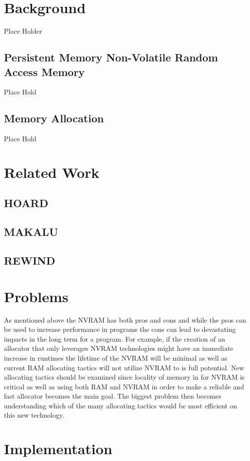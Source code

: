 \documentclass[conference]{IEEEtran}
\begin{document}
\section{Background}
Place Holder
\subsection{Persistent Memory Non-Volatile Random Access Memory}
Place Hold

\subsection{Memory Allocation}
Place Hold


\section{Related Work}
\subsection{HOARD}
\subsection{MAKALU}
\subsection {REWIND} 

\section{Problems}
As mentioned above the NVRAM has both pros and cons and while the pros can be used to increase performance in programs the cons can lead to devastating impacts in the long term for a program. For example, if the creation of an allocator that only leverages NVRAM technologies might have an immediate increase in runtimes the lifetime of the NVRAM will be minimal as well as current RAM allocating tactics will not utilize NVRAM to is full potential. New allocating tactics should be examined since locality of memory in for NVRAM is critical as well as using both RAM and NVRAM in order to make a reliable and fast allocator becomes the main goal. The biggest problem then becomes understanding which of the many allocating tactics would be most efficient on this new technology. 
\section{Implementation}
\end{document}
